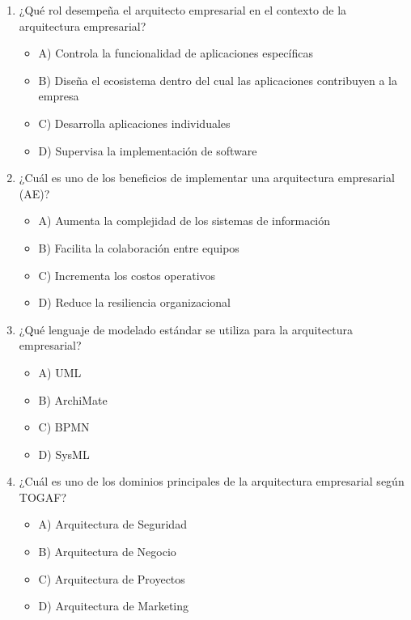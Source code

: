 \documentclass{article}
\begin{document}
\begin{enumerate}
    \item ¿Qué rol desempeña el arquitecto empresarial en el contexto de la arquitectura empresarial?
    \begin{itemize}
        \item A) Controla la funcionalidad de aplicaciones específicas
        \item B) Diseña el ecosistema dentro del cual las aplicaciones contribuyen a la empresa
        \item C) Desarrolla aplicaciones individuales
        \item D) Supervisa la implementación de software
    \end{itemize}

    \item ¿Cuál es uno de los beneficios de implementar una arquitectura empresarial (AE)?
    \begin{itemize}
        \item A) Aumenta la complejidad de los sistemas de información
        \item B) Facilita la colaboración entre equipos
        \item C) Incrementa los costos operativos
        \item D) Reduce la resiliencia organizacional
    \end{itemize}

    \item ¿Qué lenguaje de modelado estándar se utiliza para la arquitectura empresarial?
    \begin{itemize}
        \item A) UML
        \item B) ArchiMate
        \item C) BPMN
        \item D) SysML
    \end{itemize}

    \item ¿Cuál es uno de los dominios principales de la arquitectura empresarial según TOGAF?
    \begin{itemize}
        \item A) Arquitectura de Seguridad
        \item B) Arquitectura de Negocio
        \item C) Arquitectura de Proyectos
        \item D) Arquitectura de Marketing
    \end{itemize}


\end{enumerate}
\end{document}
